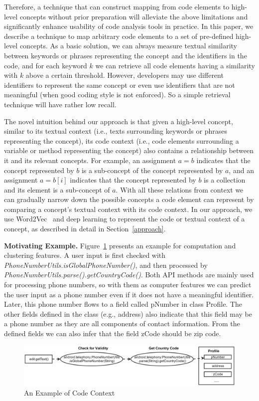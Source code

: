 Therefore, a technique that can construct mapping from code elements to high-level concepts without prior preparation will alleviate the above limitations and significantly enhance usability of code analysis tools in practice. In this paper, we describe a technique to map arbitrary code elements to a set of pre-defined high-level concepts. As a basic solution, we can always measure textual similarity between keywords or phrases representing the concept and the identifiers in the code, and for each keyword $k$ we can retrieve all code elements having a similarity with $k$ above a certain threshold. However, developers may use different identifiers to represent the same concept or even use identifiers that are not meaningful (when good coding style is not enforced). So a simple retrieval technique will have rather low recall.

The novel intuition behind our approach is that given a high-level concept, similar to its textual context (i.e., texts surrounding keywords or phrases representing the concept), its code context (i.e., code elements surrounding a variable or method representing the concept) also contains a relationship between it and its relevant concepts. For example, an assignment $a = b$ indicates that the concept represented by $b$ is a sub-concept of the concept represented by $a$, and an assignment $a = b[i]$ indicates that the concept represented by $b$ is a collection and its element is a sub-concept of $a$. With all these relations from context we can gradually narrow down the possible concepts a code element can represent by comparing a concept's textual context with its code context. In our approach, we use Word2Vec~\cite{mikolov2013efficient} and deep learning to represent the code or textual context of a concept, as described in detail in Section~\ref{approach}.

\textbf{Motivating Example.} Figure~\ref{example} presents an example for computation and clustering features. A user input is first checked with \textit{PhoneNumberUtils.isGlobalPhoneNumber()}, and then processed by \textit{PhoneNumberUtils.parse().getCountryCode()}. Both API methods are mainly used for processing phone numbers, so with them as computer features we can predict the user input as a phone number even if it does not have a meaningful identifier. Later, this phone number flows to a field called pNumber in class Profile. The other fields defined in the class (e.g., address) also indicate that this field may be a phone number as they are all components of contact information. From the defined fields we can also infer that the field zCode should be zip code.

\begin{figure}
	\centering
	\includegraphics[scale=.2]{figures/example_computationOld.png}
	\caption{An Example of Code Context}
	\vspace{-.6cm}
	\label{example}
\end{figure}


